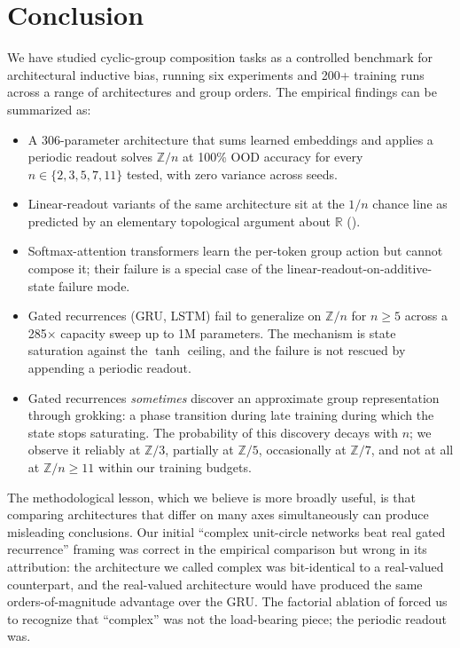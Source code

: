 \documentclass[11pt]{article}
\theoremstyle{definition}
\newcommand{\R}{\mathbb{R}}
\newcommand{\Z}{\mathbb{Z}}
\begin{document}
\section{Conclusion}
\label{sec:conclusion}

We have studied cyclic-group composition tasks as a controlled
benchmark for architectural inductive bias, running six experiments
and 200+ training runs across a range of architectures and group
orders. The empirical findings can be summarized as:

\begin{itemize}[itemsep=2pt]
\item A 306-parameter architecture that sums learned embeddings and
applies a periodic readout solves $\Z/n$ at 100\% OOD accuracy for
every $n \in \{2, 3, 5, 7, 11\}$ tested, with zero variance across
seeds.
\item Linear-readout variants of the same architecture sit at the
$1/n$ chance line as predicted by an elementary topological argument
about $\R$ ().
\item Softmax-attention transformers learn the per-token group action
but cannot compose it; their failure is a special case of the
linear-readout-on-additive-state failure mode.
\item Gated recurrences (GRU, LSTM) fail to generalize on $\Z/n$ for
$n \geq 5$ across a 285$\times$ capacity sweep up to 1M parameters.
The mechanism is state saturation against the $\tanh$ ceiling, and
the failure is not rescued by appending a periodic readout.
\item Gated recurrences \emph{sometimes} discover an approximate
group representation through grokking: a phase transition during
late training during which the state stops saturating. The
probability of this discovery decays with $n$; we observe it
reliably at $\Z/3$, partially at $\Z/5$, occasionally at $\Z/7$,
and not at all at $\Z/n \geq 11$ within our training budgets.
\end{itemize}

The methodological lesson, which we believe is more broadly useful,
is that comparing architectures that differ on many axes
simultaneously can produce misleading conclusions. Our initial
``complex unit-circle networks beat real gated recurrence''
framing was correct in the empirical comparison but wrong in its
attribution: the architecture we called complex was bit-identical
to a real-valued counterpart, and the real-valued architecture would
have produced the same orders-of-magnitude advantage over the GRU.
The factorial ablation of  forced us to recognize
that ``complex'' was not the load-bearing piece; the periodic
readout was.
\end{document}
